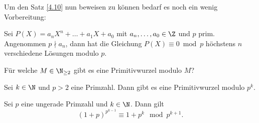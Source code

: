 Um den Satz \ref{4.10} nun beweisen zu können bedarf es noch ein wenig Vorbereitung:

\begin{thm}\autolabel
	Sei $P(X) = a_nX^n + \dots + a_1X + a_0$ mit $a_n,\dotsc,a_0 \in \Z$ und $p$ prim. Angenommen $p \nmid a_n$, dann hat die Gleichung $P(X) \equiv 0 \bmod p$ höchstens $n$ verschiedene Lösungen modulo $p$.
\end{thm}

Für welche $M \in \N_{\geq 2}$ gibt es eine Primitivwurzel modulo $M$?\video

\begin{thm}\autolabel
	Sei $k \in \N$ und $p > 2$ eine Primzahl. Dann gibt es eine Primitivwurzel modulo $p^k$.
\end{thm}

\begin{lem}\autolabel
	Sei $p$ eine ungerade Primzahl und $k \in \N$. Dann gilt
	\[ (1+p)^{p^{k-1}} \equiv 1+p^k \mod p^{k+1}. \]
\end{lem}